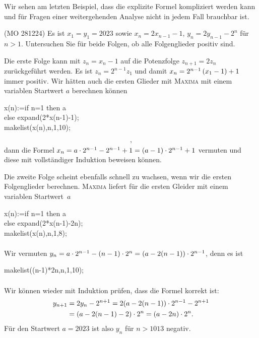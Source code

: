 \documentclass[11pt,a4paper]{article}
\newcommand{\cas}[1]{\textsc{#1}}
\begin{document}
Wir sehen am letzten Beispiel, dass die explizite Formel kompliziert
werden kann und für Fragen einer weitergehenden Analyse nicht in jedem Fall
brauchbar ist. 

\begin{aufgabe} (MO 281224)
  Es ist $x_1=y_1=2023$ sowie $x_n=2x_{n-1}-1$, $y_n=2y_{n-1}-2^n$ für $n>1$.
  Untersuchen Sie für beide Folgen, ob alle Folgenglieder positiv sind.
\end{aufgabe}

\begin{loesung}
  Die erste Folge kann mit $z_n=x_n-1$ auf die Potenzfolge $z_{n+1}=2z_n$
  zurückgeführt werden. Es ist $z_n=2^{n-1}z_1$ und damit
  $x_n=2^{n-1}\left(x_1-1\right)+1$ immer positiv.  Wir hätten auch die ersten Glieder
  mit \cas{Maxima} mit einem variablen Startwert $a$ berechnen können
  \begin{code}
    x(n):=if n=1 then a\+\\
    else expand(2*x(n-1)-1);\-\\[4pt]
    makelist(x(n),n,1,10);
  \end{code}
  \begin{gather*}
    [a, 2 a - 1, 4 a - 3, 8 a - 7, 16 a - 15, 32 a - 31, 64 a - 63, 128 a -
      127, 256 a - 255, 512 a - 511],
  \end{gather*}
dann die Formel $x_n=a\cdot 2^{n-1}-2^{n-1}+1=(a-1)\cdot 2^{n-1}+1$ vermuten und
diese mit vollständiger Induktion beweisen können.

Die zweite Folge scheint ebenfalls schnell zu wachsen, wenn wir die ersten
Folgenglieder berechnen.  \cas{Maxima} liefert für die ersten Gleider mit
einem variablen Startwert~$a$
\begin{code}
  x(n):=if n=1 then a\+\\
  else expand(2*x(n-1)-2\pw n);\-\\[4pt]
  makelist(x(n),n,1,8);
\end{code}
\begin{gather*}
  [a, 2 a - 4, 4 a - 16, 8 a - 48, 16 a - 128, 32 a - 320, 64 a - 768, 128 a -
    1792]
\end{gather*}
Wir vermuten $y_n=a\cdot 2^{n-1}-(n-1)\cdot 2^n=(a-2(n-1))\cdot 2^{n-1}$, denn es ist
\begin{code}
  makelist((n-1)*2\pw n,n,1,10);
\end{code}
\begin{gather*}
  [0, 4, 16, 48, 128, 320, 768, 1792, 4096, 9216]
\end{gather*}
Wir können wieder mit Induktion prüfen, dass die Formel korrekt ist:
\begin{align*}
  y_{n+1}&=2y_n-2^{n+1}=2(a-2(n-1))\cdot2^{n-1}-2^{n+1}\\
  &=(a-2(n-1)-2)\cdot2^n =(a-2n)\cdot 2^n.
\end{align*}
Für den Startwert $a=2023$ ist also $y_n$ für $n>1013$ negativ. 
\end{loesung}
\end{document}
